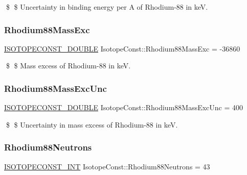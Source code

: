 \$ \$ Uncertainty in binding energy per A of Rhodium-\/88 in keV. \mbox{\label{group___isotope_const-_rhodium-_rh88_ga6df7f247f7dec83ebeb55652d7d3bdc6}} 
\subsubsection{\texorpdfstring{Rhodium88\+Mass\+Exc}{Rhodium88MassExc}}
{\footnotesize\ttfamily \mbox{\hyperlink{group___isotope_const-_macros_ga8f45a7272ce02c0b4c65c44636ed719a}{I\+S\+O\+T\+O\+P\+E\+C\+O\+N\+S\+T\+\_\+\+D\+O\+U\+B\+LE}} Isotope\+Const\+::\+Rhodium88\+Mass\+Exc = -\/36860}

\$ \$ Mass excess of Rhodium-\/88 in keV. \mbox{\label{group___isotope_const-_rhodium-_rh88_gaad41c912071ad22d6d734de60ce43369}} 
\subsubsection{\texorpdfstring{Rhodium88\+Mass\+Exc\+Unc}{Rhodium88MassExcUnc}}
{\footnotesize\ttfamily \mbox{\hyperlink{group___isotope_const-_macros_ga8f45a7272ce02c0b4c65c44636ed719a}{I\+S\+O\+T\+O\+P\+E\+C\+O\+N\+S\+T\+\_\+\+D\+O\+U\+B\+LE}} Isotope\+Const\+::\+Rhodium88\+Mass\+Exc\+Unc = 400}

\$ \$ Uncertainty in mass excess of Rhodium-\/88 in keV. \mbox{\label{group___isotope_const-_rhodium-_rh88_ga73ed69d21638be905e2b11a0ad212917}} 
\subsubsection{\texorpdfstring{Rhodium88\+Neutrons}{Rhodium88Neutrons}}
{\footnotesize\ttfamily \mbox{\hyperlink{group___isotope_const-_macros_ga5f18360b3e99483a35c32d789e62621c}{I\+S\+O\+T\+O\+P\+E\+C\+O\+N\+S\+T\+\_\+\+I\+NT}} Isotope\+Const\+::\+Rhodium88\+Neutrons = 43}

